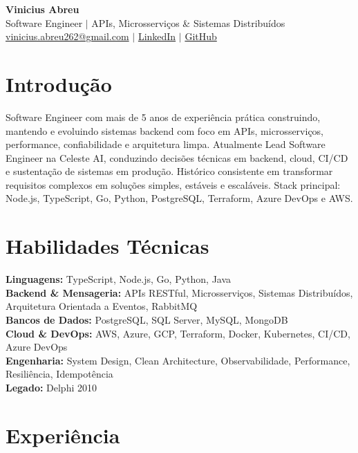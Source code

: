 \documentclass[11pt,a4paper]{article}
\begin{document}
{\LARGE \textbf{Vinicius Abreu}} \\[4pt]
Software Engineer $|$ APIs, Microsserviços \& Sistemas Distribuídos \\[6pt]

\href{mailto:vinicius.abreu262@gmail.com}{vinicius.abreu262@gmail.com} $|$
\href{https://www.linkedin.com/in/vs-abreu/}{LinkedIn} $|$
\href{https://github.com/vinnedev}{GitHub} \\[10pt]

\section*{Introdução}
Software Engineer com mais de 5 anos de experiência prática construindo, mantendo e evoluindo sistemas backend com foco em APIs, microsserviços, performance, confiabilidade e arquitetura limpa. Atualmente Lead Software Engineer na Celeste AI, conduzindo decisões técnicas em backend, cloud, CI/CD e sustentação de sistemas em produção. Histórico consistente em transformar requisitos complexos em soluções simples, estáveis e escaláveis. Stack principal: Node.js, TypeScript, Go, Python, PostgreSQL, Terraform, Azure DevOps e AWS.

\section*{Habilidades Técnicas}
\textbf{Linguagens:} TypeScript, Node.js, Go, Python, Java \\[3pt]
\textbf{Backend \& Mensageria:} APIs RESTful, Microsserviços, Sistemas Distribuídos, Arquitetura Orientada a Eventos, RabbitMQ \\[3pt]
\textbf{Bancos de Dados:} PostgreSQL, SQL Server, MySQL, MongoDB \\[3pt]
\textbf{Cloud \& DevOps:} AWS, Azure, GCP, Terraform, Docker, Kubernetes, CI/CD, Azure DevOps \\[3pt]
\textbf{Engenharia:} System Design, Clean Architecture, Observabilidade, Performance, Resiliência, Idempotência \\[3pt]
\textbf{Legado:} Delphi 2010

\section*{Experiência}
\end{document}
